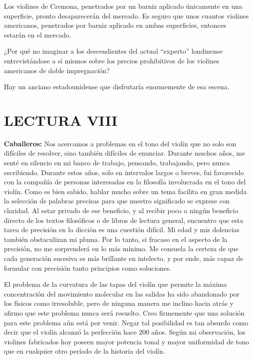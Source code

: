 \documentclass[12pt]{book}
\begin{document}
Los violines de Cremona, penetrados por un barniz aplicado únicamente en una superficie, pronto desaparecerán del mercado. Es seguro que unos cuantos violines americanos, penetrados por barniz aplicado en ambas superficies, entonces estarán en el mercado.  

¿Por qué no imaginar a los descendientes del actual ``experto'' londinense entrevistándose a sí mismos sobre los precios prohibitivos de los violines americanos de doble impregnación?  

Hay un anciano estadounidense que disfrutaría enormemente de esa escena.

\section*{LECTURA VIII}

\textbf{Caballeros:} Nos acercamos a problemas en el tono del violín que no solo son difíciles de resolver, sino también difíciles de enunciar. Durante muchos años, me senté en silencio en mi banco de trabajo, pensando, trabajando, pero nunca escribiendo. Durante estos años, solo en intervalos largos o breves, fui favorecido con la compañía de personas interesadas en la filosofía involucrada en el tono del violín. Como es bien sabido, hablar mucho sobre un tema facilita en gran medida la selección de palabras precisas para que nuestro significado se exprese con claridad. Al estar privado de ese beneficio, y al recibir poco o ningún beneficio directo de los textos filosóficos o de libros de lectura general, encuentro que esta tarea de precisión en la dicción es una cuestión difícil. Mi edad y mis dolencias también obstaculizan mi pluma. Por lo tanto, si fracaso en el aspecto de la precisión, no me sorprenderá en lo más mínimo. Me consuela la certeza de que cada generación sucesiva es más brillante en intelecto, y por ende, más capaz de formular con precisión tanto principios como soluciones.

El problema de la curvatura de las tapas del violín que permite la máxima concentración del movimiento molecular en las salidas ha sido abandonado por los físicos como irresoluble, pero de ninguna manera me inclino hacia atrás y afirmo que este problema nunca será resuelto. Creo firmemente que una solución para este problema aún está por venir. Negar tal posibilidad es tan absurdo como decir que el violín alcanzó la perfección hace 200 años. Según mi observación, los violines fabricados hoy poseen mayor potencia tonal y mayor uniformidad de tono que en cualquier otro período de la historia del violín.
\end{document}
